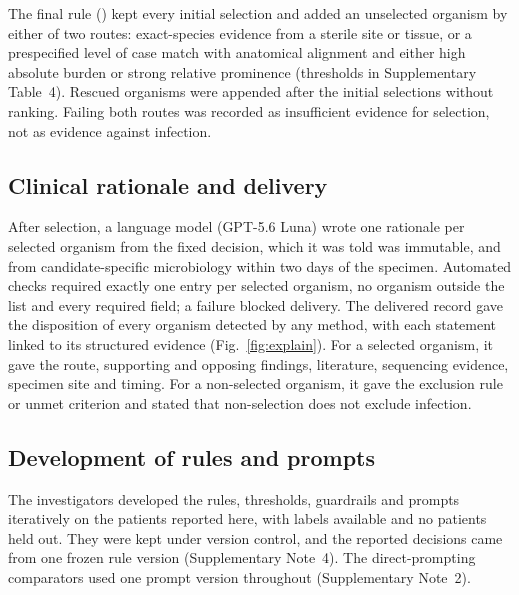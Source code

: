 The final rule (\rfive) kept every initial selection and added an unselected organism by either of two routes: exact-species evidence from a sterile site or tissue, or a prespecified level of case match with anatomical alignment and either high absolute burden or strong relative prominence (thresholds in Supplementary Table~4). Rescued organisms were appended after the initial selections without ranking. Failing both routes was recorded as insufficient evidence for selection, not as evidence against infection.

\subsection*{Clinical rationale and delivery}
After selection, a language model (GPT-5.6 Luna) wrote one rationale per selected organism from the fixed decision, which it was told was immutable, and from candidate-specific microbiology within two days of the \mngs specimen. Automated checks required exactly one entry per selected organism, no organism outside the list and every required field; a failure blocked delivery. The delivered record gave the disposition of every organism detected by any method, with each statement linked to its structured evidence (Fig.~\ref{fig:explain}). For a selected organism, it gave the route, supporting and opposing findings, literature, sequencing evidence, specimen site and timing. For a non-selected organism, it gave the exclusion rule or unmet criterion and stated that non-selection does not exclude infection.

\subsection*{Development of rules and prompts}
The investigators developed the rules, thresholds, guardrails and prompts iteratively on the patients reported here, with labels available and no patients held out. They were kept under version control, and the reported decisions came from one frozen rule version (Supplementary Note~4). The direct-prompting comparators used one prompt version throughout (Supplementary Note~2). 

